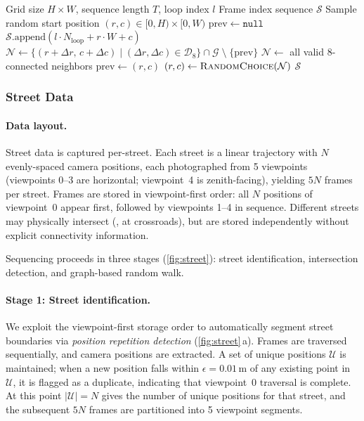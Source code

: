 \begin{algorithm}[t]
\caption{Aerial Grid Random Walk}
\label{alg:aerial}
\begin{algorithmic}[1]
\Require Grid size $H\!\times\!W$, sequence length $T$, loop index $l$
\Ensure Frame index sequence $\mathcal{S}$
\State Sample random start position $(r, c) \in [0,H) \times [0,W)$
\State $\mathrm{prev} \gets \texttt{null}$
    \State $\mathcal{S}.\text{append}(l \cdot N_{\mathrm{loop}} + r \cdot W + c)$
    \State $\mathcal{N} \gets \{(r\!+\!\Delta r,\, c\!+\!\Delta c) \mid (\Delta r, \Delta c) \in \mathcal{D}_8\} \cap \mathcal{G} \;\setminus\; \{\mathrm{prev}\}$
        \State $\mathcal{N} \gets$ all valid 8-connected neighbors 
    \EndIf
    \State $\mathrm{prev} \gets (r, c)$
    \State $(r, c) \gets \textsc{RandomChoice}(\mathcal{N})$
\EndFor
\State \Return $\mathcal{S}$
\end{algorithmic}
\end{algorithm}

\subsubsection{Street Data}
\label{sec:street_data}

\paragraph{Data layout.}
Street data is captured per-street. Each street is a linear trajectory with $N$ evenly-spaced camera positions, each photographed from 5 viewpoints (viewpoints 0--3 are horizontal; viewpoint~4 is zenith-facing), yielding $5N$ frames per street. Frames are stored in viewpoint-first order: all $N$ positions of viewpoint~0 appear first, followed by viewpoints 1--4 in sequence. Different streets may physically intersect (\eg, at crossroads), but are stored independently without explicit connectivity information.

Sequencing proceeds in three stages (\cref{fig:street}): street identification, intersection detection, and graph-based random walk.

\paragraph{Stage 1: Street identification.}
We exploit the viewpoint-first storage order to automatically segment street boundaries via \emph{position repetition detection} (\cref{fig:street}\,a). Frames are traversed sequentially, and camera positions are extracted. A set of unique positions $\mathcal{U}$ is maintained; when a new position falls within $\epsilon = 0.01$\,m of any existing point in $\mathcal{U}$, it is flagged as a duplicate, indicating that viewpoint~0 traversal is complete. At this point $|\mathcal{U}| = N$ gives the number of unique positions for that street, and the subsequent $5N$ frames are partitioned into 5 viewpoint segments.

